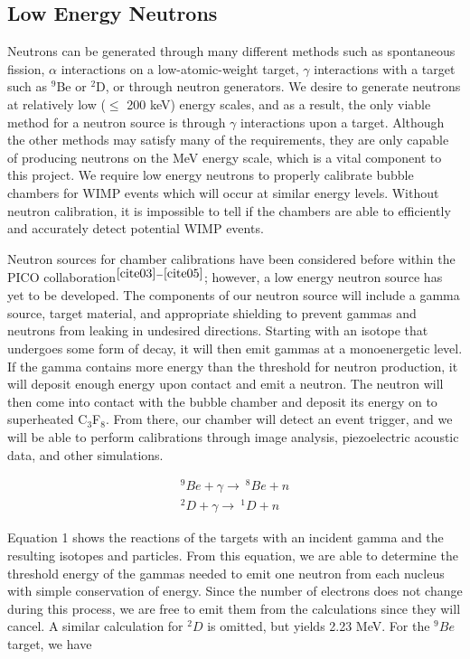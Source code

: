 \documentclass[%
12pt,
twoside,
reprint,
amsmath,amssymb,
aps,
]{article}
\begin{document}
	\subsection{Low Energy Neutrons}
	\par Neutrons can be generated through many different methods such as spontaneous fission, $\alpha$ interactions on a low-atomic-weight target, $\gamma$ interactions with a target such as $^{9}$Be or $^{2}$D, or through neutron generators. We desire to generate neutrons at relatively low ($\leq$ 200 keV) energy scales, and as a result, the only viable method for a neutron source is through $\gamma$ interactions upon a target. Although the other methods may satisfy many of the requirements, they are only capable of producing neutrons on the MeV energy scale, which is a vital component to this project. We require low energy neutrons to properly calibrate bubble chambers for WIMP events which will occur at similar energy levels. Without neutron calibration, it is impossible to tell if the chambers are able to efficiently and accurately detect potential WIMP events.
	\par Neutron sources for chamber calibrations have been considered before within the PICO collaboration$^{\cite{cite03}-\cite{cite05}}$; however, a low energy neutron source has yet to be developed. The components of our neutron source will include a gamma source, target material, and appropriate shielding to prevent gammas and neutrons from leaking in undesired directions. Starting with an isotope that undergoes some form of decay, it will then emit gammas at a monoenergetic level. If the gamma contains more energy than the threshold for neutron production, it will deposit enough energy upon contact and emit a neutron. The neutron will then come into contact with the bubble chamber and deposit its energy on to superheated C$_{3}$F$_{8}$. From there, our chamber will detect an event trigger, and we will be able to perform calibrations through image analysis, piezoelectric acoustic data, and other simulations.
	
	\begin{equation}
	\begin{aligned}	
	^{9}Be + \gamma \longrightarrow\ ^{8}Be + n \\
	^{2}D + \gamma \longrightarrow\ ^{1}D + n
	\end{aligned}
	\end{equation}
	
	\par Equation 1 shows the reactions of the targets with an incident gamma and the resulting isotopes and particles. From this equation, we are able to determine the threshold energy of the gammas needed to emit one neutron from each nucleus with simple conservation of energy. Since the number of electrons does not change during this process, we are free to emit them from the calculations since they will cancel. A similar calculation for $^{2}D$ is omitted, but yields 2.23 MeV. For the $^{9}Be$ target, we have
	
\end{document}
